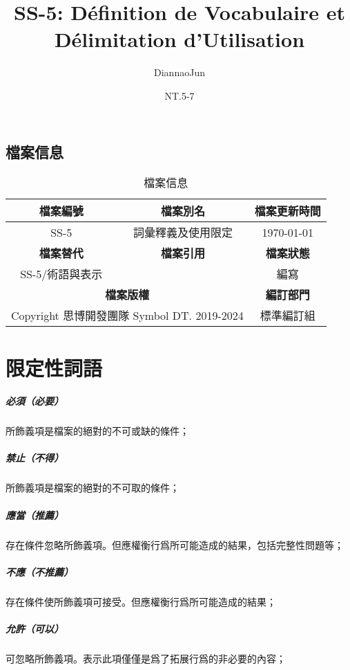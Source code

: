 \documentclass[16pt, a4paper]{article}
\begin{document}
	\title{SS-5: Définition de Vocabulaire et Délimitation d'Utilisation}
	\author{DiannaoJun}
	\date{NT.5-7}
	\maketitle              %
	\tableofcontents
		\subsection{檔案信息}
			\begin{table}[ht]\centering
				\begin{tabular}{|c|c|c|}
    				\hline
    					\textbf{檔案編號} & \textbf{檔案別名} & \textbf{檔案更新時間 }\\
					\hline
						SS-5 & 詞彙釋義及使用限定 & \today{} \\
    				\hline
    				\hline
    					\textbf{檔案替代} & \textbf{檔案引用} & \textbf{檔案狀態} \\
    				\hline
    					SS-5/術語與表示 & ~ & 編寫 \\
    				\hline
    				\hline
    					\multicolumn{2}{|c|}{\textbf{檔案版權}} & \textbf{編訂部門}\\
    				\hline
    					\multicolumn{2}{|c|}{Copyright \textcopyright{} 思博開發團隊 Symbol DT. 2019-2024} & 標準編訂組 \\
    				\hline
    			\end{tabular}
    		\caption{檔案信息}\label{tab:multicolumn}\end{table}
	\section{限定性詞語}
		\subparagraph{必須（必要）} 所飾義項是檔案的絕對的不可或缺的條件；
		\subparagraph{禁止（不得）} 所飾義項是檔案的絕對的不可取的條件；
		\subparagraph{應當（推薦）} 存在條件忽略所飾義項。但應權衡行爲所可能造成的結果，包括完整性問題等；
		\subparagraph{不應（不推薦）} 存在條件使所飾義項可接受。但應權衡行爲所可能造成的結果；
		\subparagraph{允許（可以）} 可忽略所飾義項。表示此項僅僅是爲了拓展行爲的非必要的內容；
\end{document}
